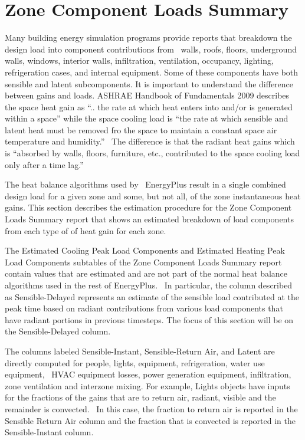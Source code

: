 \section{Zone Component Loads Summary}\label{zone-component-loads-summary}

Many building energy simulation programs provide reports that breakdown the design load into component contributions from~ walls, roofs, floors, underground walls, windows, interior walls, infiltration, ventilation, occupancy, lighting, refrigeration cases, and internal equipment. Some of these components have both sensible and latent subcomponents. It is important to understand the difference between gains and loads. ASHRAE Handbook of Fundamentals 2009 describes the space heat gain as ``.. the rate at which heat enters into and/or is generated within a space'' while the space cooling load is ``the rate at which sensible and latent heat must be removed fro the space to maintain a constant space air temperature and humidity.''~ The difference is that the radiant heat gains which is ``absorbed by walls, floors, furniture, etc., contributed to the space cooling load only after a time lag.''

The heat balance algorithms used by~ EnergyPlus result in a single combined design load for a given zone and some, but not all, of the zone instantaneous heat gains. This section describes the estimation procedure for the Zone Component Loads Summary report that shows an estimated breakdown of load components from each type of of heat gain for each zone.

The Estimated Cooling Peak Load Components and Estimated Heating Peak Load Components subtables of the Zone Component Loads Summary report contain values that are estimated and are not part of the normal heat balance algorithms used in the rest of EnergyPlus.~ In particular, the column described as Sensible-Delayed represents an estimate of the sensible load contributed at the peak time based on radiant contributions from various load components that have radiant portions in previous timesteps. The focus of this section will be on the Sensible-Delayed column.

The columns labeled Sensible-Instant, Sensible-Return Air, and Latent are directly computed for people, lights, equipment, refrigeration, water use equipment,~ HVAC equipment losses, power generation equipment, infiltration, zone ventilation and interzone mixing. For example, Lights objects have inputs for the fractions of the gains that are to return air, radiant, visible and the remainder is convected.~ In this case, the fraction to return air is reported in the Sensible Return Air column and the fraction that is convected is reported in the Sensible-Instant column.

